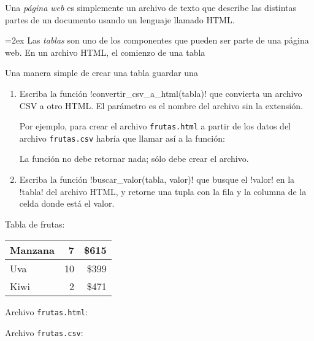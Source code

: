 Una \emph{página web}
es simplemente un archivo de texto
que describe las distintas partes de un documento
usando un lenguaje llamado HTML.

\begin{minipage}[t]{0.7\textwidth}
  \parskip=2ex
  Las \emph{tablas} son uno de los componentes
  que pueden ser parte de una página web.
  En un archivo HTML,
  el comienzo de una tabla

  Una manera simple de crear una tabla
  guardar una

  \begin{enumerate}[leftmargin=0pt,label=\emph{\alph*})]

    \item
      Escriba la función \li!convertir_csv_a_html(tabla)!
      que convierta un archivo CSV a otro HTML.
      El parámetro es el nombre del archivo sin la extensión.

      Por ejemplo,
      para crear el archivo \verb!frutas.html!
      a partir de los datos del archivo \verb!frutas.csv!
      habría que llamar así a la función:
      

      La función no debe retornar nada; sólo debe crear el archivo.

    \item
      Escriba la función \li!buscar_valor(tabla, valor)!
      que busque el \li!valor! en la \li!tabla! del archivo HTML,
      y retorne una tupla con la fila y la columna
      de la celda donde está el valor.

  \end{enumerate}

\end{minipage}
\hfill
\begin{minipage}[t]{0.25\textwidth}
  \centering
  Tabla de frutas: \\[1ex]
  \begin{tabular}{|l|r|r|}  \hline
    Manzana &  7 & \$615 \\ \hline
    Uva     & 10 & \$399 \\ \hline
    Kiwi    &  2 & \$471 \\ \hline
  \end{tabular}
  \vspace{1ex}

  Archivo \verb+frutas.html+:
  

  Archivo \verb+frutas.csv+:
  
\end{minipage}

